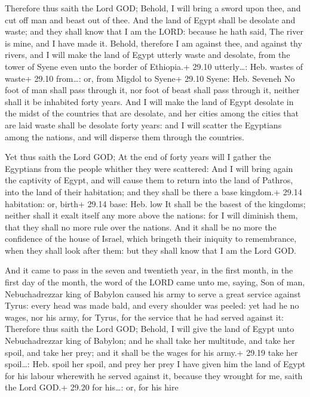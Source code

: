  Therefore thus saith the Lord GOD; Behold, I will bring a
sword upon thee, and cut off man and beast out of thee.  And
the land of Egypt shall be desolate and waste; and they shall know that
I am the LORD: because he hath said, The river is mine, and I have made
it.  Behold, therefore I am against thee, and against thy
rivers, and I will make the land of Egypt utterly waste and desolate,
from the tower of Syene even unto the border of Ethiopia.+ 29.10
utterly\ldots: Heb. wastes of waste+ 29.10 from\ldots: or, from Migdol
to Syene+ 29.10 Syene: Heb. Seveneh  No foot of man shall
pass through it, nor foot of beast shall pass through it, neither shall
it be inhabited forty years.  And I will make the land of
Egypt desolate in the midst of the countries that are desolate, and her
cities among the cities that are laid waste shall be desolate forty
years: and I will scatter the Egyptians among the nations, and will
disperse them through the countries.

 Yet thus saith the Lord GOD; At the end of forty years
will I gather the Egyptians from the people whither they were scattered:
 And I will bring again the captivity of Egypt, and will
cause them to return into the land of Pathros, into the land of their
habitation; and they shall be there a base kingdom.+ 29.14 habitation:
or, birth+ 29.14 base: Heb. low  It shall be the basest of
the kingdoms; neither shall it exalt itself any more above the nations:
for I will diminish them, that they shall no more rule over the nations.
 And it shall be no more the confidence of the house of
Israel, which bringeth their iniquity to remembrance, when they shall
look after them: but they shall know that I am the Lord GOD.

 And it came to pass in the seven and twentieth year, in
the first month, in the first day of the month, the word of the LORD
came unto me, saying,  Son of man, Nebuchadrezzar king of
Babylon caused his army to serve a great service against Tyrus: every
head was made bald, and every shoulder was peeled: yet had he no wages,
nor his army, for Tyrus, for the service that he had served against it:
 Therefore thus saith the Lord GOD; Behold, I will give the
land of Egypt unto Nebuchadrezzar king of Babylon; and he shall take her
multitude, and take her spoil, and take her prey; and it shall be the
wages for his army.+ 29.19 take her spoil\ldots: Heb. spoil her spoil,
and prey her prey  I have given him the land of Egypt for
his labour wherewith he served against it, because they wrought for me,
saith the Lord GOD.+ 29.20 for his\ldots: or, for his hire

